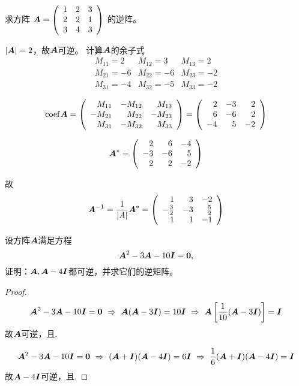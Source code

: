 \begin{li}
  求方阵
  $
  \boldsymbol{A} = \left(
    \begin{array}{ccc}
      1 & 2 & 3\\
      2 & 2 & 1\\
      3 & 4 & 3
    \end{array}
  \right)
  $
  的逆阵。
\end{li}
\begin{jie}
$|\boldsymbol{A}| = 2$，故$\boldsymbol{A}$可逆。 计算$\boldsymbol{A}$的余子式
$$
\begin{array}{lll}
  M_{11}=2 & M_{12}=3 & M_{13}=2\\
  M_{21}=-6 & M_{22}=-6 & M_{23}=-2\\
  M_{31}=-4 & M_{32}=-5 & M_{33}=-2
\end{array}
$$

$$
\mathrm{coef} \boldsymbol{A} = \left(
  \begin{array}{rrr}
    M_{11} & -M_{12} &  M_{13}\\
    -M_{21} &  M_{22} & -M_{23}\\
    M_{31} & -M_{32} &  M_{33}
  \end{array}
\right)  = \left(
  \begin{array}{rrr}
    2 & -3 &  2\\
    6 & -6 &  2 \\
    -4 & 5 & -2
  \end{array}
\right)
$$

$$
\boldsymbol{A}^* =  \left(
  \begin{array}{rrr}
    2 & 6 &  -4\\
    -3 & -6 & 5 \\
    2 & 2 & -2
  \end{array}
\right)
$$

故
$$
\boldsymbol{A}^{-1} = \frac1{|A|}\boldsymbol{A}^* = \left(
  \begin{array}{rrr}
    1 & 3 &  -2\\
    -\frac32 & -3 & \frac52 \\
    1 & 1 & -1
  \end{array}
\right)
$$
\end{jie}

\begin{li}
  设方阵$\boldsymbol{A}$满足方程
  $$
  \MA^2 - 3\MA - 10 \MI = \M0,
  $$
  证明：$\boldsymbol{A}, \boldsymbol{A}-4\boldsymbol{I}$都可逆，并求它们的逆矩阵。      
\end{li}
\begin{proof}
$$
\MA^2-3\MA-10\MI=\M0 ~\Rightarrow~ \MA(\MA-3\MI) = 10\MI 
~\Rightarrow~ \MA\left[\frac1{10}(\MA-3\MI)\right] = \MI
$$  
故$\boldsymbol{A}$可逆，且.

$$
\MA^2-3\MA-10\MI=\M0 ~\Rightarrow~ (\MA+\MI)(\MA-4\MI) = 6\MI 
~\Rightarrow~ \frac1{6}(\MA+\MI)(\MA-4\MI) = \MI
$$     
故$\boldsymbol{A}-4\boldsymbol{I}$可逆，且.

\end{proof}

